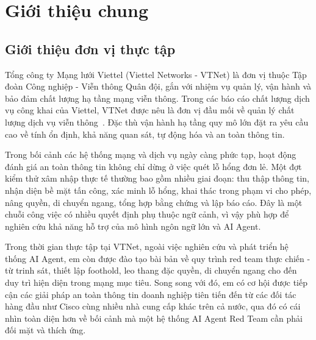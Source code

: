 
\section{Giới thiệu chung}
\label{sec:gioi-thieu-chung}

\subsection{Giới thiệu đơn vị thực tập}
\label{sec:don-vi-thuc-tap}

Tổng công ty Mạng lưới Viettel (Viettel Networks - VTNet) là đơn vị thuộc Tập đoàn Công nghiệp - Viễn thông Quân đội, gắn với nhiệm vụ quản lý, vận hành và bảo đảm chất lượng hạ tầng mạng viễn thông. Trong các báo cáo chất lượng dịch vụ công khai của Viettel, VTNet được nêu là đơn vị đầu mối về quản lý chất lượng dịch vụ viễn thông~\cite{vtnet}. Đặc thù vận hành hạ tầng quy mô lớn đặt ra yêu cầu cao về tính ổn định, khả năng quan sát, tự động hóa và an toàn thông tin.

Trong bối cảnh các hệ thống mạng và dịch vụ ngày càng phức tạp, hoạt động đánh giá an toàn thông tin không chỉ dừng ở việc quét lỗ hổng đơn lẻ. Một đợt kiểm thử xâm nhập thực tế thường bao gồm nhiều giai đoạn: thu thập thông tin, nhận diện bề mặt tấn công, xác minh lỗ hổng, khai thác trong phạm vi cho phép, nâng quyền, di chuyển ngang, tổng hợp bằng chứng và lập báo cáo. Đây là một chuỗi công việc có nhiều quyết định phụ thuộc ngữ cảnh, vì vậy phù hợp để nghiên cứu khả năng hỗ trợ của mô hình ngôn ngữ lớn và AI Agent.

Trong thời gian thực tập tại VTNet, ngoài việc nghiên cứu và phát triển hệ thống AI Agent, em còn được đào tạo bài bản về quy trình red team thực chiến - từ trinh sát, thiết lập foothold, leo thang đặc quyền, di chuyển ngang cho đến duy trì hiện diện trong mạng mục tiêu. Song song với đó, em có cơ hội được tiếp cận các giải pháp an toàn thông tin doanh nghiệp tiên tiến đến từ các đối tác hàng đầu như Cisco cùng nhiều nhà cung cấp khác trên cả nước, qua đó có cái nhìn toàn diện hơn về bối cảnh mà một hệ thống AI Agent Red Team cần phải đối mặt và thích ứng.

